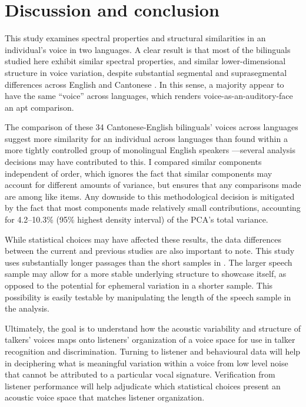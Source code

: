 \section{Discussion and conclusion}\label{ch3:sec:discussion}

This study examines spectral properties and structural similarities in an individual's voice in two languages. A clear result is that most of the bilinguals studied here exhibit similar spectral properties, and similar lower-dimensional structure in voice variation, despite substantial segmental and suprasegmental differences across English and Cantonese \citep{matthews_2013_cantonese}. In this sense, a majority appear to have the same ``voice'' across languages, which renders voice-as-an-auditory-face an apt comparison.

The comparison of these 34 Cantonese-English bilinguals' voices across languages suggest more similarity for an individual across languages than found within a more tightly controlled group of monolingual English speakers \citep{lee_2019_acoustic-paper}---several analysis decisions may have contributed to this. I compared similar components independent of order, which ignores the fact that similar components may account for different amounts of variance, but ensures that any comparisons made are among like items. Any downside to this methodological decision is mitigated by the fact that most components made relatively small contributions, accounting for 4.2--10.3\% (95\% highest density interval) of the PCA's total variance. 

While statistical choices may have affected these results, the data differences between the current and previous studies are also important to note. This study uses substantially longer passages than the short samples in \citet{lee_2019_acoustic-paper}. The larger speech sample may allow for a more stable underlying structure to showcase itself, as opposed to the potential for ephemeral variation in a shorter sample. This possibility is easily testable by manipulating the length of the speech sample in the analysis.

Ultimately, the goal is to understand how the acoustic variability and structure of talkers' voices maps onto listeners' organization of a voice space for use in talker recognition and discrimination. Turning to listener and behavioural data will help in deciphering what is meaningful variation within a voice from low level noise that cannot be attributed to a particular vocal signature. Verification from listener performance will help adjudicate which statistical choices present an acoustic voice space that matches listener organization. 

\endinput %
